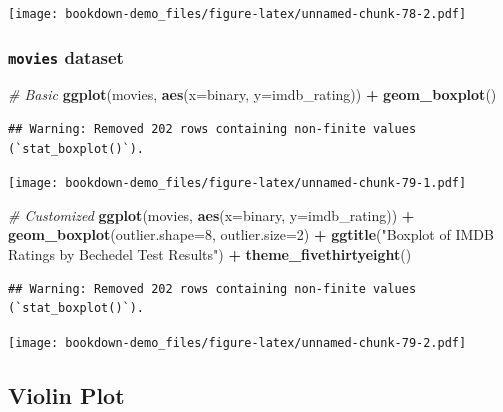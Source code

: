 \documentclass[
  b5paper]{book}
\newenvironment{Shaded}{\begin{snugshade}}{\end{snugshade}}
\newcommand{\AttributeTok}[1]{\textcolor[rgb]{0.13,0.29,0.53}{#1}}
\newcommand{\CommentTok}[1]{\textcolor[rgb]{0.56,0.35,0.01}{\textit{#1}}}
\newcommand{\DecValTok}[1]{\textcolor[rgb]{0.00,0.00,0.81}{#1}}
\newcommand{\FunctionTok}[1]{\textcolor[rgb]{0.13,0.29,0.53}{\textbf{#1}}}
\newcommand{\NormalTok}[1]{#1}
\newcommand{\SpecialCharTok}[1]{\textcolor[rgb]{0.81,0.36,0.00}{\textbf{#1}}}
\newcommand{\StringTok}[1]{\textcolor[rgb]{0.31,0.60,0.02}{#1}}
\begin{document}
\texttt{[image: bookdown-demo\_files/figure-latex/unnamed-chunk-78-2.pdf]}

\hypertarget{movies-dataset-2}{%
\subsubsection*{\texorpdfstring{\texttt{movies} dataset}{movies dataset}}\label{movies-dataset-2}}

\begin{Shaded}
\begin{Highlighting}[]
\CommentTok{\# Basic}
\FunctionTok{ggplot}\NormalTok{(movies, }\FunctionTok{aes}\NormalTok{(}\AttributeTok{x=}\NormalTok{binary, }\AttributeTok{y=}\NormalTok{imdb\_rating)) }\SpecialCharTok{+} \FunctionTok{geom\_boxplot}\NormalTok{()}
\end{Highlighting}
\end{Shaded}

\begin{verbatim}
## Warning: Removed 202 rows containing non-finite values (`stat_boxplot()`).
\end{verbatim}

\texttt{[image: bookdown-demo\_files/figure-latex/unnamed-chunk-79-1.pdf]}

\begin{Shaded}
\begin{Highlighting}[]
\CommentTok{\# Customized}
\FunctionTok{ggplot}\NormalTok{(movies, }\FunctionTok{aes}\NormalTok{(}\AttributeTok{x=}\NormalTok{binary, }\AttributeTok{y=}\NormalTok{imdb\_rating)) }\SpecialCharTok{+}
  \FunctionTok{geom\_boxplot}\NormalTok{(}\AttributeTok{outlier.shape=}\DecValTok{8}\NormalTok{, }\AttributeTok{outlier.size=}\DecValTok{2}\NormalTok{) }\SpecialCharTok{+}
  \FunctionTok{ggtitle}\NormalTok{(}\StringTok{"Boxplot of IMDB Ratings by Bechedel Test Results"}\NormalTok{) }\SpecialCharTok{+}
  \FunctionTok{theme\_fivethirtyeight}\NormalTok{()}
\end{Highlighting}
\end{Shaded}

\begin{verbatim}
## Warning: Removed 202 rows containing non-finite values (`stat_boxplot()`).
\end{verbatim}

\texttt{[image: bookdown-demo\_files/figure-latex/unnamed-chunk-79-2.pdf]}

\hypertarget{violin-plot}{%
\subsection*{Violin Plot}\label{violin-plot}}
\end{document}
